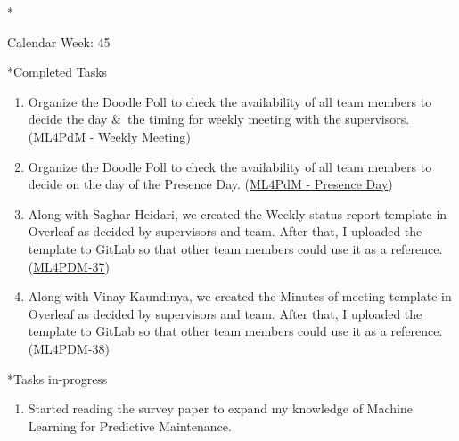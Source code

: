 \documentclass[11pt,a4paper]{article}
\begin{document}
\newpage
\begin{section}*{Calendar Week: 45 \hfill \date{06 November, 2020}}
 \begin{refsection}
     \begin{subsection}*{Completed Tasks}
         \begin{enumerate}
             \item
                   Organize the Doodle Poll to check the availability of all team members to decide the day \&\ the timing for weekly meeting with the supervisors. (\href{https://doodle.com/poll/3u7z6hh52wvttfhz?utm_source=poll&utm_medium=link}{ML4PdM - Weekly Meeting})
             \item
                   Organize the Doodle Poll to check the availability of all team members to decide on the day of the Presence Day. (\href{https://doodle.com/poll/2p2dmvq7xgvkmgf7?utm_source=poll&utm_medium=link}{ML4PdM - Presence Day})
             \item
                   Along with Saghar Heidari, we created the Weekly status report template in Overleaf as decided by supervisors and team. After that, I uploaded the template to GitLab so that other team members could use it as a reference. (\href{https://ml4pdm.atlassian.net/browse/ML4PDM-37}{ML4PDM-37})
             \item
                   Along with Vinay Kaundinya, we created the Minutes of meeting template in Overleaf as decided by supervisors and team. After that, I uploaded the template to GitLab so that other team members could use it as a reference. (\href{https://ml4pdm.atlassian.net/browse/ML4PDM-38}{ML4PDM-38})
         \end{enumerate}
     \end{subsection}

     \begin{subsection}*{Tasks in-progress}
         \begin{enumerate}
             \item
                   Started reading the survey paper \cite{DBLP:journals/corr/abs-1912-07383} to expand my knowledge of Machine Learning for Predictive Maintenance.
         \end{enumerate}
     \end{subsection}

     \printbibliography
 \end{refsection}
\end{section}
\end{document}
